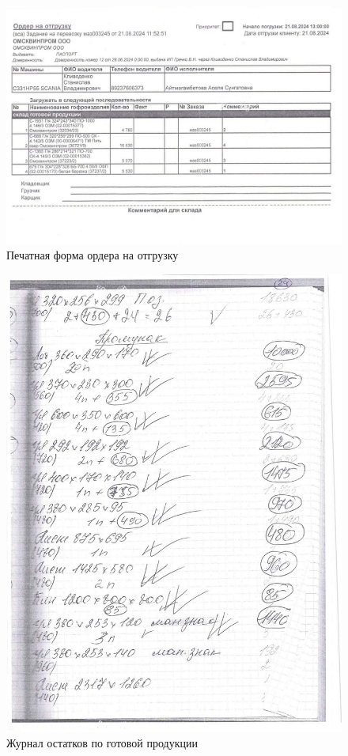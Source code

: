 \begin{figure}
\begin{center}
  \includegraphics[height=0.6\textheight, angle=90, keepaspectratio]{Pics/d27.jpg}
\end{center}
  \caption{Печатная форма ордера на отгрузку}
  \label{pic:d27}
\end{figure}

\begin{figure}
\begin{center}
  \includegraphics[height=0.8\textheight, keepaspectratio]{Pics/d28.jpg}
\end{center}
  \caption{Журнал остатков по готовой продукции}
  \label{pic:d28}
\end{figure}


